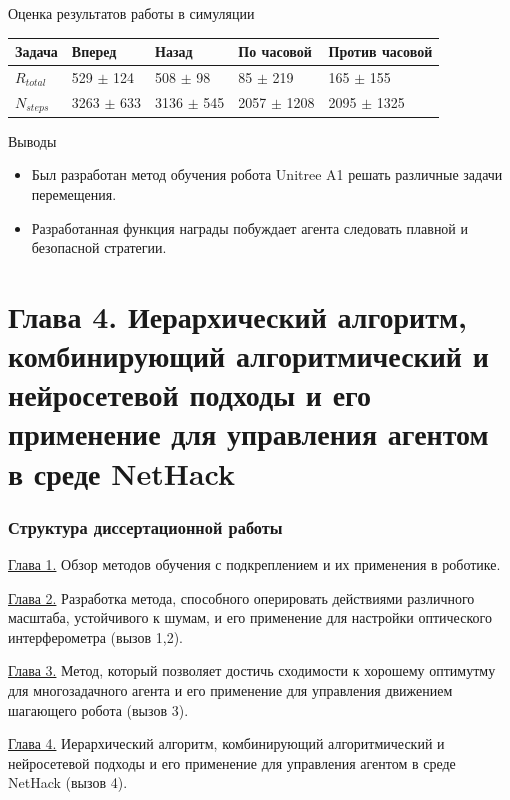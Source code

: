 \begin{frame}{Оценка результатов работы в симуляции}
\begin{table} [htbp]
\begin{threeparttable}
\begin{tabular}{| p{1cm} || p{2cm} | p{2cm} | p{2cm} |p{2cm} |}
            \hline
            \hline
            Задача & Вперед & Назад & По часовой & Против часовой \\
            \hline
            $R_{total}$ &	529 $\pm$ 124 &	508 $\pm$ 98 &	85 $\pm$ 219 &	165 $\pm$ 155 \\
            $N_{steps}$ & 3263 $\pm$ 633 &	3136 $\pm$ 545 &	2057 $\pm$ 1208 &	2095 $\pm$ 1325 \\
            \hline
            \hline
        \end{tabular}
    \end{threeparttable}
\end{table}
\end{frame}

\begin{frame}{Выводы}
\begin{itemize}
    \item[\textcolor{ForestGreen}{\checkmark}] Был разработан метод обучения робота Unitree A1 решать различные задачи перемещения.
    \item[\textcolor{ForestGreen}{\checkmark}] Разработанная функция награды побуждает агента следовать плавной и безопасной стратегии.
\end{itemize}
\end{frame}



\section{Глава 4. Иерархический алгоритм, комбинирующий алгоритмический и
нейросетевой подходы и его применение для управления агентом в среде NetHack}


\begin{frame}
    \frametitle{Структура диссертационной работы}
    \begin{itemize}
        \item \underline{Глава 1.} Обзор методов обучения с подкреплением и их применения в роботике. 
        \item \underline{Глава 2.} Разработка метода, способного оперировать действиями различного масштаба, устойчивого к шумам, и его применение для настройки оптического интерферометра (вызов 1,2).
        \item \underline{Глава 3.} Метод, который позволяет достичь сходимости к хорошему оптимутму для многозадачного агента и его применение  для управления движением шагающего робота (вызов 3).
        {\color{orange}\item \underline{Глава 4.} Иерархический алгоритм, комбинирующий алгоритмический и нейросетевой подходы и его применение для управления агентом в среде NetHack (вызов 4).}
    \end{itemize}
\end{frame}

